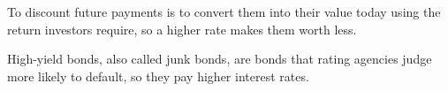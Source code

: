 \begin{keyterms}
\small
\begin{description}[leftmargin=0pt, itemsep=2pt, parsep=0pt, font=\normalfont\bfseries\color{FEMaroon}]
  \item[Discount.] To discount future payments is to convert them into their value today using the return investors require, so a higher rate makes them worth less.
  \item[High-yield bonds.] High-yield bonds, also called junk bonds, are bonds that rating agencies judge more likely to default, so they pay higher interest rates.
\end{description}
\end{keyterms}
